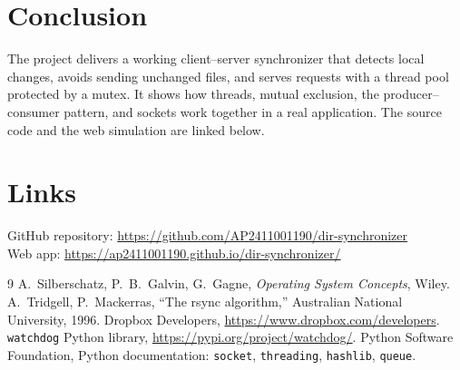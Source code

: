 \documentclass[12pt,a4paper]{article}
\begin{document}
\section{Conclusion}
The project delivers a working client--server synchronizer that detects local changes, avoids sending unchanged files, and serves requests with a thread pool protected by a mutex. It shows how threads, mutual exclusion, the producer--consumer pattern, and sockets work together in a real application. The source code and the web simulation are linked below.

\section*{Links}
GitHub repository: \url{https://github.com/AP2411001190/dir-synchronizer}\\
Web app: \url{https://ap2411001190.github.io/dir-synchronizer/}

\begin{thebibliography}{9}
 A.~Silberschatz, P.~B.~Galvin, G.~Gagne, \emph{Operating System Concepts}, Wiley.
 A.~Tridgell, P.~Mackerras, ``The rsync algorithm,'' Australian National University, 1996.
 Dropbox Developers, \url{https://www.dropbox.com/developers}.
 \texttt{watchdog} Python library, \url{https://pypi.org/project/watchdog/}.
 Python Software Foundation, Python documentation: \texttt{socket}, \texttt{threading}, \texttt{hashlib}, \texttt{queue}.
\end{thebibliography}
\end{document}
